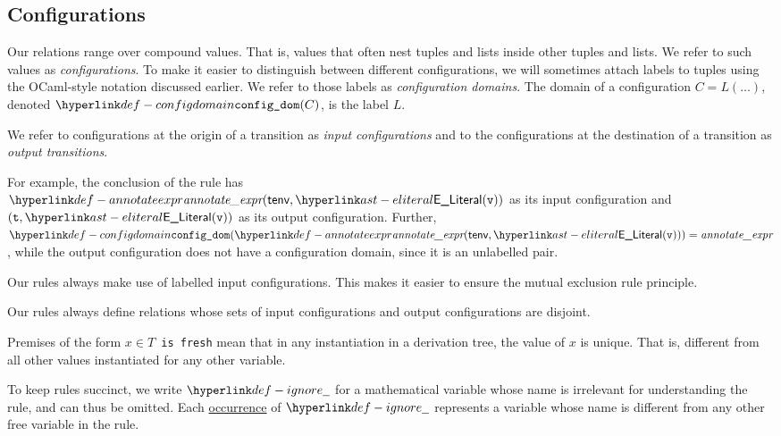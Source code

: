 \hypertarget{def-configuration}{}
\subsection{Configurations}

\hypertarget{def-configdomain}{}
Our relations range over compound values. That is, values that often nest tuples and lists inside other tuples and lists.
We refer to such values as \emph{configurations}. To make it easier to distinguish between different configurations,
we will sometimes attach labels to tuples using the OCaml-style notation discussed earlier.
We refer to those labels as \emph{configuration domains}.
The domain of a configuration $C=L(\ldots)$, denoted $\configdomain{C}$, is the label $L$.

We refer to configurations at the origin of a transition as \emph{input configurations} and to the
configurations at the destination of a transition as \emph{output transitions}.

For example, the conclusion of the rule  has \\
$\annotateexpr{\tenv, \ELiteral(\vv)}$ as its input configuration
and $(\vt, \ELiteral(\vv))$ as its output configuration.
Further, \\
$\configdomain{\annotateexpr{\tenv, \ELiteral(\vv)}} = \textit{annotate\_expr}$,
while the output configuration does not have a configuration domain, since it is an unlabelled pair.

Our rules always make use of labelled input configurations. This makes it easier to ensure
the mutual exclusion rule principle.

Our rules always define relations whose sets of input configurations and output configurations are disjoint.

\hypertarget{def-freshvariables}{}
\begin{definition}
  Premises of the form \texttt{$x\in T$ is fresh} mean that in any
  instantiation in a derivation tree, the value of $x$ is unique.
  That is, different from all other values instantiated for any other variable.
\end{definition}

\hypertarget{def-ignore}{}
\begin{definition}
To keep rules succinct, we write $\Ignore$ for a mathematical variable whose name is
irrelevant for understanding the rule, and can thus be omitted.
Each \underline{occurrence} of $\Ignore$ represents a variable whose name is
different from any other free variable in the rule.
\end{definition}

